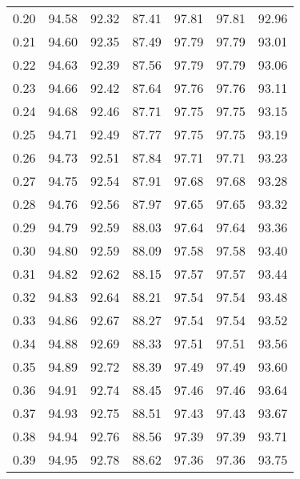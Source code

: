 \begin{tabular}{|c|c|c|c|c|c|c|}
      0.20 &     94.58 &     92.32 &      87.41 &   97.81 &      97.81 &         92.96 \\
      0.21 &     94.60 &     92.35 &      87.49 &   97.79 &      97.79 &         93.01 \\
      0.22 &     94.63 &     92.39 &      87.56 &   97.79 &      97.79 &         93.06 \\
      0.23 &     94.66 &     92.42 &      87.64 &   97.76 &      97.76 &         93.11 \\
      0.24 &     94.68 &     92.46 &      87.71 &   97.75 &      97.75 &         93.15 \\
      0.25 &     94.71 &     92.49 &      87.77 &   97.75 &      97.75 &         93.19 \\
      0.26 &     94.73 &     92.51 &      87.84 &   97.71 &      97.71 &         93.23 \\
      0.27 &     94.75 &     92.54 &      87.91 &   97.68 &      97.68 &         93.28 \\
      0.28 &     94.76 &     92.56 &      87.97 &   97.65 &      97.65 &         93.32 \\
      0.29 &     94.79 &     92.59 &      88.03 &   97.64 &      97.64 &         93.36 \\
      0.30 &     94.80 &     92.59 &      88.09 &   97.58 &      97.58 &         93.40 \\
      0.31 &     94.82 &     92.62 &      88.15 &   97.57 &      97.57 &         93.44 \\
      0.32 &     94.83 &     92.64 &      88.21 &   97.54 &      97.54 &         93.48 \\
      0.33 &     94.86 &     92.67 &      88.27 &   97.54 &      97.54 &         93.52 \\
      0.34 &     94.88 &     92.69 &      88.33 &   97.51 &      97.51 &         93.56 \\
      0.35 &     94.89 &     92.72 &      88.39 &   97.49 &      97.49 &         93.60 \\
      0.36 &     94.91 &     92.74 &      88.45 &   97.46 &      97.46 &         93.64 \\
      0.37 &     94.93 &     92.75 &      88.51 &   97.43 &      97.43 &         93.67 \\
      0.38 &     94.94 &     92.76 &      88.56 &   97.39 &      97.39 &         93.71 \\
      0.39 &     94.95 &     92.78 &      88.62 &   97.36 &      97.36 &         93.75 \\

\end{tabular}
